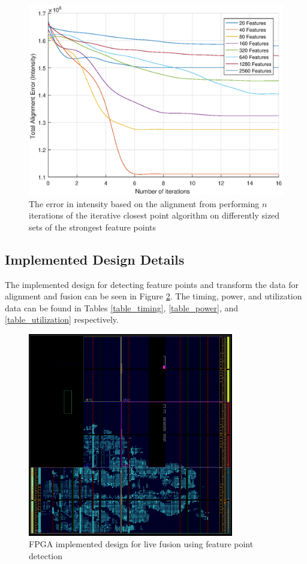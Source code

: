 \documentclass[sigconf]{acmart/acmart}
\begin{document}
\begin{figure}[h]
	\centering
	\includegraphics[width=\textwidth]{figures/alignment/error_for_alignment}
	\caption{The error in intensity based on the alignment from performing $n$ iterations of the iterative closest point algorithm on differently sized sets of the strongest feature points}
	\label{fig_results_alignment_error_plot}
\end{figure}

\subsection{Implemented Design Details}

The implemented design for detecting feature points and transform the data for alignment and fusion can be seen in Figure \ref{fig_implemented}. The timing, power, and utilization data can be found in Tables \ref{table_timing}, \ref{table_power}, and \ref{table_utilization} respectively.

\begin{figure}[h]
	\centering
	\includegraphics[width=0.8\textwidth]{figures/pictures/implemented}
	\caption{FPGA implemented design for live fusion using feature point detection}
	\label{fig_implemented}
\end{figure}
\end{document}
